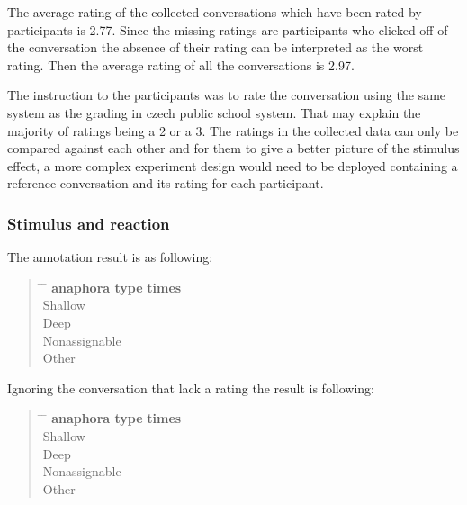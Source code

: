 The average rating of the collected conversations
which have been rated by participants is 2.77.
Since the missing ratings are participants who clicked off of the conversation
the absence of their rating can be interpreted as the worst rating.
Then the average rating of all the conversations is 2.97.

The instruction to the participants was to rate the conversation
using the same system as the grading in czech public school system.
That may explain the majority of ratings being a 2 or a 3.
The ratings in the collected data can only be compared against each other and
for them to give a better picture of the stimulus effect,
a more complex experiment design would need to be deployed
containing a reference conversation and its rating for each participant.

\subsubsection{Stimulus and reaction}

The annotation result is as following:

\begin{quote}
\begin{tabbing}
\hspace{4cm} \= \hspace{4cm} \= \kill %
\textbf{anaphora type} \> \textbf{times} \\
Shallow  \\
Deep  \\
Nonassignable  \\
Other 
\end{tabbing}
\end{quote}

Ignoring the conversation that lack a rating the result is following:

\begin{quote}
\begin{tabbing}
\hspace{4cm} \= \hspace{4cm} \= \kill %
\textbf{anaphora type} \> \textbf{times} \\
Shallow  \\
Deep  \\
Nonassignable  \\
Other 
\end{tabbing}
\end{quote}

